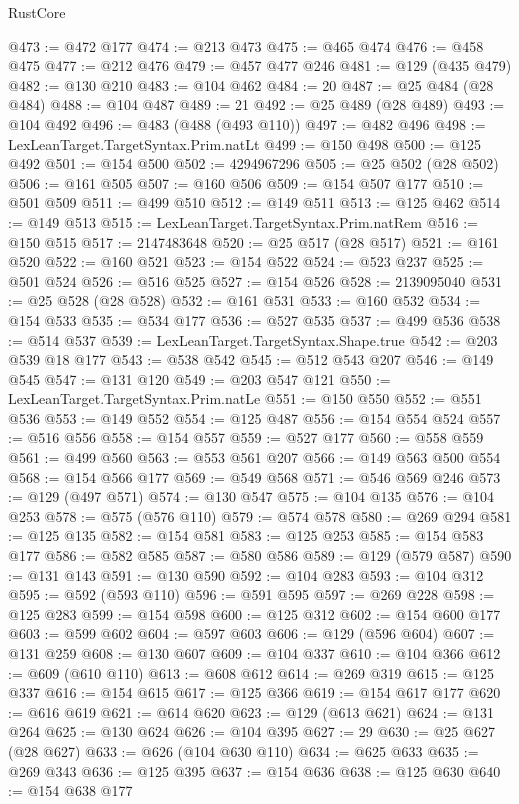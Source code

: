 \begin{lexlean}{RustCore}
\begin{coremodule}
@473 := @472 @177
@474 := @213 @473
@475 := @465 @474
@476 := @458 @475
@477 := @212 @476
@479 := @457 @477 @246
@481 := @129 (@435 @479)
@482 := @130 @210
@483 := @104 @462
@484 := 20
@487 := @25 @484 (@28 @484)
@488 := @104 @487
@489 := 21
@492 := @25 @489 (@28 @489)
@493 := @104 @492
@496 := @483 (@488 (@493 @110))
@497 := @482 @496
@498 := LexLeanTarget.TargetSyntax.Prim.natLt
@499 := @150 @498
@500 := @125 @492
@501 := @154 @500
@502 := 4294967296
@505 := @25 @502 (@28 @502)
@506 := @161 @505
@507 := @160 @506
@509 := @154 @507 @177
@510 := @501 @509
@511 := @499 @510
@512 := @149 @511
@513 := @125 @462
@514 := @149 @513
@515 := LexLeanTarget.TargetSyntax.Prim.natRem
@516 := @150 @515
@517 := 2147483648
@520 := @25 @517 (@28 @517)
@521 := @161 @520
@522 := @160 @521
@523 := @154 @522
@524 := @523 @237
@525 := @501 @524
@526 := @516 @525
@527 := @154 @526
@528 := 2139095040
@531 := @25 @528 (@28 @528)
@532 := @161 @531
@533 := @160 @532
@534 := @154 @533
@535 := @534 @177
@536 := @527 @535
@537 := @499 @536
@538 := @514 @537
@539 := LexLeanTarget.TargetSyntax.Shape.true
@542 := @203 @539 @18 @177
@543 := @538 @542
@545 := @512 @543 @207
@546 := @149 @545
@547 := @131 @120
@549 := @203 @547 @121
@550 := LexLeanTarget.TargetSyntax.Prim.natLe
@551 := @150 @550
@552 := @551 @536
@553 := @149 @552
@554 := @125 @487
@556 := @154 @554 @524
@557 := @516 @556
@558 := @154 @557
@559 := @527 @177
@560 := @558 @559
@561 := @499 @560
@563 := @553 @561 @207
@566 := @149 @563 @500 @554
@568 := @154 @566 @177
@569 := @549 @568
@571 := @546 @569 @246
@573 := @129 (@497 @571)
@574 := @130 @547
@575 := @104 @135
@576 := @104 @253
@578 := @575 (@576 @110)
@579 := @574 @578
@580 := @269 @294
@581 := @125 @135
@582 := @154 @581
@583 := @125 @253
@585 := @154 @583 @177
@586 := @582 @585
@587 := @580 @586
@589 := @129 (@579 @587)
@590 := @131 @143
@591 := @130 @590
@592 := @104 @283
@593 := @104 @312
@595 := @592 (@593 @110)
@596 := @591 @595
@597 := @269 @228
@598 := @125 @283
@599 := @154 @598
@600 := @125 @312
@602 := @154 @600 @177
@603 := @599 @602
@604 := @597 @603
@606 := @129 (@596 @604)
@607 := @131 @259
@608 := @130 @607
@609 := @104 @337
@610 := @104 @366
@612 := @609 (@610 @110)
@613 := @608 @612
@614 := @269 @319
@615 := @125 @337
@616 := @154 @615
@617 := @125 @366
@619 := @154 @617 @177
@620 := @616 @619
@621 := @614 @620
@623 := @129 (@613 @621)
@624 := @131 @264
@625 := @130 @624
@626 := @104 @395
@627 := 29
@630 := @25 @627 (@28 @627)
@633 := @626 (@104 @630 @110)
@634 := @625 @633
@635 := @269 @343
@636 := @125 @395
@637 := @154 @636
@638 := @125 @630
@640 := @154 @638 @177

\end{coremodule}
\end{lexlean}
